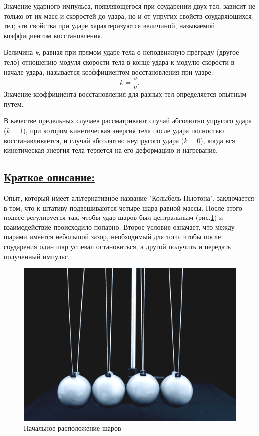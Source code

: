 \documentclass[14pt,a4paper,oneside]{extarticle}	%
\begin{document}
Значение ударного импульса, появляющегося при соударении двух тел, зависит не только от их масс и скоростей до удара, но и от упругих свойств соударяющихся тел; эти свойства при ударе характеризуются величиной, называемой коэффициентом восстановления.

Величина \textit{k}, равная при прямом ударе тела о неподвижную преграду (другое тело) отношению модуля
скорости тела в конце удара к модулю скорости в начале удара, называется коэффициентом восстановления при ударе:
$$
k = \frac{v}{u}.
$$
Значение коэффициента восстановления для разных тел определяется опытным путем.

В качестве предельных случаев рассматривают случай абсолютно упругого удара ($ k=1 $), при котором кинетическая энергия тела после удара полностью восстанавливается, и случай абсолютно неупругого удара ($ k=0 $), когда вся кинетическая энергия тела теряется на его деформацию и нагревание.

\newpage
\subsection*{\underline{Краткое описание:}}

Опыт, который имеет альтернативное название "Колыбель Ньютона", заключается в том, что к штативу подвешиваются четыре шара равной массы.
После этого подвес регулируется так, чтобы удар шаров был центральным (рис.\ref{impact-2}) и взаимодействие происходило попарно.
Второе условие означает, что между шарами имеется небольшой зазор, необходимый для того, чтобы после соударения один шар успевал остановиться, а другой получить и передать полученный импульс.
\begin{figure}[H]
	\centering 	
	\includegraphics[width=0.9\linewidth]{impact-2.png}
	\caption{Начальное расположение шаров}
	\label{impact-2}
\end{figure}
\end{document}
